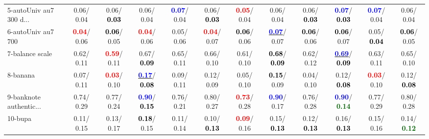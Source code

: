 \begin{table}[h]
\begin{center}
{\begin{tabular}{lc|c|c|c|c|c|c|c|c|c|c}
5-autoUniv au7 300 d... &   0.06/  0.04 &   0.06/\textcolor{black}{\textbf{  0.03}} &   0.06/  0.04 & \textcolor{blue}{\textbf{  0.07}}/  0.04 &   0.06/\textcolor{black}{\textbf{  0.03}} & \textcolor{red}{\textbf{  0.05}}/  0.04 &   0.06/  0.04 &   0.06/\textcolor{black}{\textbf{  0.03}} & \textcolor{blue}{\textbf{  0.07}}/\textcolor{black}{\textbf{  0.03}} & \textcolor{blue}{\textbf{  0.07}}/  0.04 &   0.06/  0.04 \\
6-autoUniv au7 700 & \textcolor{red}{\textbf{  0.04}}/  0.06 & \textcolor{black}{\textbf{  0.06}}/  0.05 & \textcolor{red}{\textbf{  0.04}}/  0.06 &   0.05/  0.06 & \textcolor{red}{\textbf{  0.04}}/  0.07 & \textcolor{black}{\textbf{  0.06}}/  0.06 & \underline{\textcolor{blue}{\textbf{  0.07}}}/  0.07 & \textcolor{black}{\textbf{  0.06}}/  0.06 & \textcolor{black}{\textbf{  0.06}}/  0.07 &   0.05/\textcolor{black}{\textbf{  0.04}} & \textcolor{black}{\textbf{  0.06}}/  0.05 \\
7-balance scale &   0.62/  0.11 & \textcolor{red}{\textbf{  0.59}}/  0.11 &   0.67/\textcolor{black}{\textbf{  0.09}} &   0.65/  0.11 &   0.66/  0.10 &   0.61/  0.10 & \textcolor{black}{\textbf{  0.68}}/\textcolor{black}{\textbf{  0.09}} &   0.62/  0.12 & \underline{\textcolor{blue}{\textbf{  0.69}}}/\textcolor{black}{\textbf{  0.09}} &   0.63/  0.11 &   0.65/  0.10 \\ \hline
8-banana &   0.07/  0.11 & \textcolor{red}{\textbf{  0.03}}/  0.10 & \underline{\textcolor{blue}{\textbf{  0.17}}}/\textcolor{black}{\textbf{  0.08}} &   0.09/  0.11 &   0.12/  0.09 &   0.05/  0.10 & \textcolor{black}{\textbf{  0.15}}/  0.09 &   0.04/  0.10 &   0.12/\textcolor{black}{\textbf{  0.08}} & \textcolor{red}{\textbf{  0.03}}/  0.10 &   0.12/\textcolor{black}{\textbf{  0.08}} \\
9-banknote authentic... &   0.74/  0.29 &   0.77/  0.24 & \textcolor{blue}{\textbf{  0.90}}/\textcolor{black}{\textbf{  0.15}} &   0.76/  0.21 &   0.80/  0.27 & \textcolor{red}{\textbf{  0.73}}/  0.28 & \textcolor{blue}{\textbf{  0.90}}/  0.17 &   0.76/  0.28 & \textcolor{blue}{\textbf{  0.90}}/\textcolor{darkgreen}{\textbf{  0.14}} &   0.77/  0.29 &   0.80/  0.28 \\
10-bupa &   0.11/  0.15 &   0.13/  0.17 & \textcolor{black}{\textbf{  0.18}}/  0.15 &   0.11/  0.14 &   0.10/\textcolor{black}{\textbf{  0.13}} & \textcolor{red}{\textbf{  0.09}}/  0.16 &   0.15/\textcolor{black}{\textbf{  0.13}} &   0.12/\textcolor{black}{\textbf{  0.13}} &   0.16/\textcolor{black}{\textbf{  0.13}} &   0.15/  0.16 &   0.14/\textcolor{darkgreen}{\textbf{  0.12}} \\

\end{tabular}}
\end{center}
\end{table}
